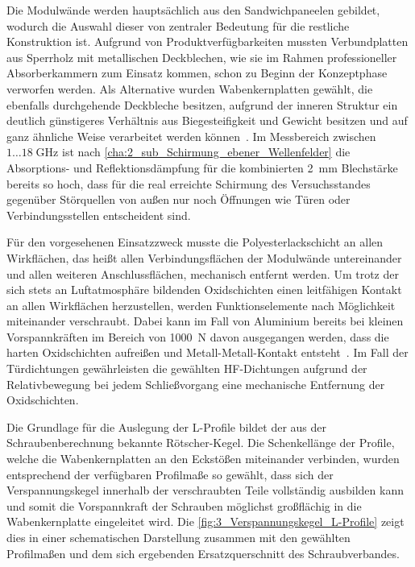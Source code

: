 Die Modulwände werden hauptsächlich aus den Sandwichpaneelen gebildet, wodurch die Auswahl dieser von zentraler Bedeutung für die restliche Konstruktion ist. Aufgrund von Produktverfügbarkeiten mussten Verbundplatten aus Sperrholz mit metallischen Deckblechen, wie sie im Rahmen professioneller Absorberkammern zum Einsatz kommen, schon zu Beginn der Konzeptphase verworfen werden. Als Alternative wurden Wabenkernplatten gewählt, die ebenfalls durchgehende Deckbleche besitzen, aufgrund der inneren Struktur ein deutlich günstigeres Verhältnis aus Biegesteifigkeit und Gewicht besitzen und auf ganz ähnliche Weise verarbeitet werden können~\cite{Alucore-Datenblatt}. Im Messbereich zwischen $1\ldots18\;\si{\giga\hertz}$ ist nach \Abschnitt\ref{cha:2_sub_Schirmung_ebener_Wellenfelder} die Absorptions- und Reflektionsdämpfung für die kombinierten \SI{2}{\milli\meter} Blechstärke bereits so hoch, dass für die real erreichte Schirmung des Versuchsstandes gegenüber Störquellen von außen nur noch Öffnungen wie Türen oder Verbindungsstellen entscheident sind.  
\par
\vspace{\linespace}
Für den vorgesehenen Einsatzzweck musste die Polyesterlackschicht an allen Wirkflächen, das heißt allen Verbindungsflächen der Modulwände untereinander und allen weiteren Anschlussflächen, mechanisch entfernt werden. Um trotz der sich stets an Luftatmosphäre bildenden Oxidschichten einen leitfähigen Kontakt an allen Wirkflächen herzustellen, werden Funktionselemente nach Möglichkeit miteinander verschraubt. Dabei kann im Fall von Aluminium bereits bei kleinen Vorspannkräften im Bereich von \SI{1000}{\newton} davon ausgegangen werden, dass die harten Oxidschichten aufreißen und Metall-Metall-Kontakt entsteht~\cite{Projektarbeit}. Im Fall der Türdichtungen gewährleisten die gewählten HF-Dichtungen aufgrund der Relativbewegung bei jedem Schließvorgang eine mechanische Entfernung der Oxidschichten.
\par
\vspace{\linespace}
Die Grundlage für die Auslegung der L-Profile bildet der aus der Schraubenberechnung bekannte Rötscher-Kegel. Die Schenkellänge der Profile, welche die Wabenkernplatten an den Eckstößen miteinander verbinden, wurden entsprechend der verfügbaren Profilmaße so gewählt, dass sich der Verspannungskegel innerhalb der verschraubten Teile vollständig ausbilden kann und somit die Vorspannkraft der Schrauben möglichst großflächig in die Wabenkernplatte eingeleitet wird. Die \Abb\ref{fig:3_Verspannungskegel_L-Profile} zeigt dies in einer schematischen Darstellung zusammen mit den gewählten Profilmaßen und dem sich ergebenden Ersatzquerschnitt des Schraubverbandes. 

